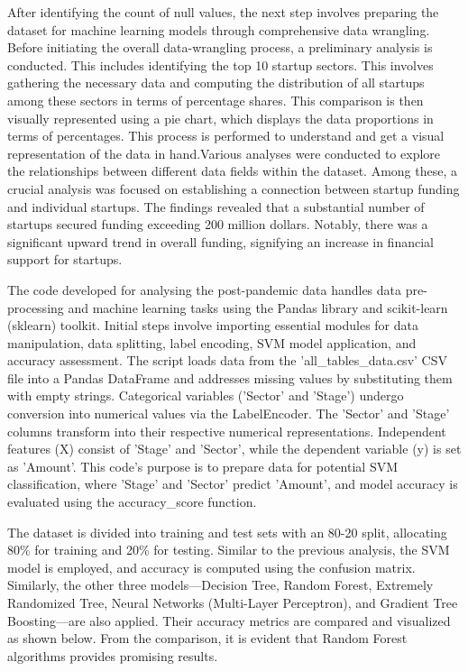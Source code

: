 \documentclass[12pt]{article}
\begin{document}
After identifying the count of null values, the next step involves preparing the dataset for machine learning models through comprehensive data wrangling. Before initiating the overall data-wrangling process, a preliminary analysis is conducted. This includes identifying the top 10 startup sectors. This involves gathering the necessary data and computing the distribution of all startups among these sectors in terms of percentage shares. This comparison is then visually represented using a pie chart, which displays the data proportions in terms of percentages. This process is performed to understand and get a visual representation of the data in hand.Various analyses were conducted to explore the relationships between different data fields within the dataset. Among these, a crucial analysis was focused on establishing a connection between startup funding and individual startups. The findings revealed that a substantial number of startups secured funding exceeding 200 million dollars. Notably, there was a significant upward trend in overall funding, signifying an increase in financial support for startups.

The code developed for analysing the post-pandemic data handles data pre-processing and machine learning tasks using the Pandas library and scikit-learn (sklearn) toolkit. Initial steps involve importing essential modules for data manipulation, data splitting, label encoding, SVM model application, and accuracy assessment. The script loads data from the 'all\_tables\_data.csv' CSV file into a Pandas DataFrame and addresses missing values by substituting them with empty strings. Categorical variables ('Sector' and 'Stage') undergo conversion into numerical values via the LabelEncoder. The 'Sector' and 'Stage' columns transform into their respective numerical representations. Independent features (X) consist of 'Stage' and 'Sector', while the dependent variable (y) is set as 'Amount'. This code's purpose is to prepare data for potential SVM classification, where 'Stage' and 'Sector' predict 'Amount', and model accuracy is evaluated using the accuracy\_score function.

The dataset is divided into training and test sets with an 80-20 split, allocating 80\% for training and 20\% for testing. Similar to the previous analysis, the SVM model is employed, and accuracy is computed using the confusion matrix. Similarly, the other three models—Decision Tree, Random Forest, Extremely Randomized Tree, Neural Networks (Multi-Layer Perceptron), and Gradient Tree Boosting—are also applied. Their accuracy metrics are compared and visualized as shown below. From the comparison, it is evident that Random Forest algorithms provides promising results.
\end{document}

